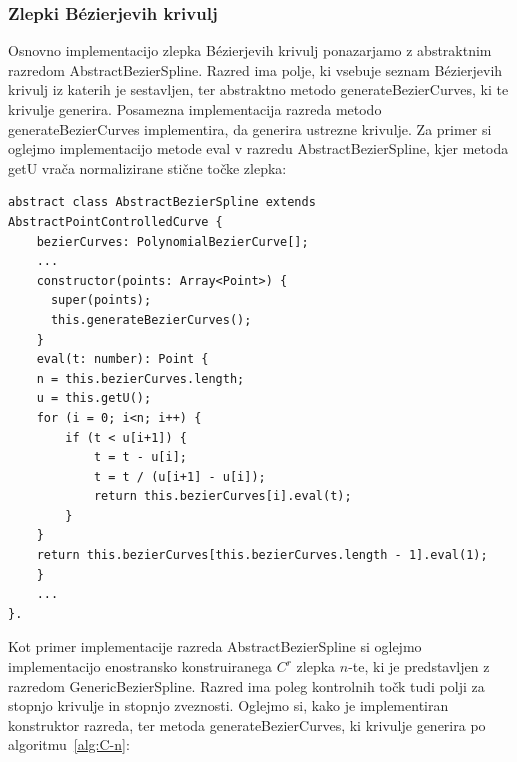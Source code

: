 \documentclass[isrm2, tisk]{fmfdelo}
\begin{document}
    \subsubsection*{Zlepki Bézierjevih krivulj}
    Osnovno implementacijo zlepka Bézierjevih krivulj ponazarjamo z abstraktnim razredom AbstractBezierSpline.
    Razred ima polje, ki vsebuje seznam Bézierjevih krivulj iz katerih je sestavljen, ter abstraktno metodo generateBezierCurves, ki te krivulje generira.
    Posamezna implementacija razreda metodo generateBezierCurves implementira, da generira ustrezne krivulje.
    Za primer si oglejmo implementacijo metode eval v razredu AbstractBezierSpline, kjer metoda getU vrača normalizirane stične točke zlepka:
    \begin{lstlisting}[label={lst:zlepek}]
abstract class AbstractBezierSpline extends AbstractPointControlledCurve {
    bezierCurves: PolynomialBezierCurve[];
    ...
    constructor(points: Array<Point>) {
      super(points);
      this.generateBezierCurves();
    }
    eval(t: number): Point {
    n = this.bezierCurves.length;
    u = this.getU();
    for (i = 0; i<n; i++) {
        if (t < u[i+1]) {
            t = t - u[i];
            t = t / (u[i+1] - u[i]);
            return this.bezierCurves[i].eval(t);
        }
    }
    return this.bezierCurves[this.bezierCurves.length - 1].eval(1);
    }
    ...
}.
    \end{lstlisting}
    Kot primer implementacije razreda AbstractBezierSpline si oglejmo implementacijo enostransko konstruiranega $C^r$ zlepka $n$-te, ki je predstavljen z razredom GenericBezierSpline.
    Razred ima poleg kontrolnih točk tudi polji za stopnjo krivulje in stopnjo zveznosti.
    Oglejmo si, kako je implementiran konstruktor razreda, ter metoda generateBezierCurves, ki krivulje generira po algoritmu~\ref{alg:C-n}:
\end{document}
